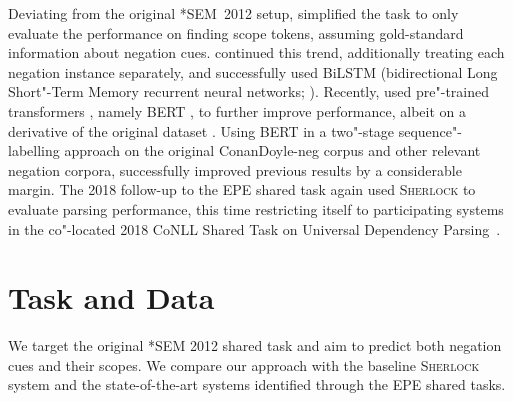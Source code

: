 \documentclass[11pt,a4paper]{article}
\theoremstyle{plain}
\begin{document}
Deviating from the original *SEM~2012 setup, \citet{Pac:Ben:Rea:14} simplified
the task to only evaluate the performance on finding scope
tokens, assuming gold-standard information about negation cues.
\citet{fancellu2016neural,fancellu2018neural} continued this trend, additionally
treating each negation instance separately, and successfully used BiLSTM
(bidirectional Long Short"-Term Memory recurrent neural networks;
\citealp{hochreiter1997long}).
Recently, \citet{sergeeva2019neural} used pre"-trained transformers
\citep{vaswani2017attention}, namely BERT \citep{devlin2019bert}, to
further improve performance, albeit on a derivative of the original
dataset \citep{liu2018negpar}.
Using BERT in a two"-stage sequence"-labelling approach on the original
ConanDoyle-neg corpus and other relevant negation corpora,
\citet{khandelwal2020negbert} successfully improved previous results by a
considerable margin.
The 2018 follow-up to the EPE shared task \citep{Far:Oep:Ovr:18} again used \textsc{Sherlock}
to evaluate parsing performance, this time restricting itself to participating systems in the
co"-located 2018 CoNLL Shared Task on Universal Dependency
Parsing~\citep{zeman2018conll}.


\section{Task and Data}
\label{sec:background}

We target the original *SEM 2012 shared task and aim to predict both negation cues and their scopes.
We compare our approach with the baseline \textsc{Sherlock} system and the state-of-the-art systems identified through the EPE shared tasks.
\end{document}
